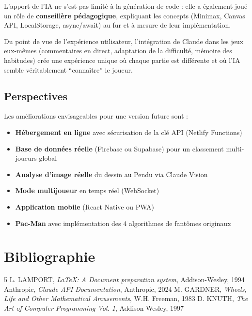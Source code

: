 \documentclass[a4paper, 12pt, twoside]{article}
\begin{document}
L'apport de l'IA ne s'est pas limité à la génération de code : elle a également joué un rôle de \textbf{conseillère pédagogique}, expliquant les concepts (Minimax, Canvas API, LocalStorage, async/await) au fur et à mesure de leur implémentation.

Du point de vue de l'expérience utilisateur, l'intégration de Claude dans les jeux eux-mêmes (commentaires en direct, adaptation de la difficulté, mémoire des habitudes) crée une expérience unique où chaque partie est différente et où l'IA semble véritablement ``connaître'' le joueur.

\subsection{Perspectives}

Les améliorations envisageables pour une version future sont :
\begin{itemize}
  \item \textbf{Hébergement en ligne} avec sécurisation de la clé API (Netlify Functions)
  \item \textbf{Base de données réelle} (Firebase ou Supabase) pour un classement multi-joueurs global
  \item \textbf{Analyse d'image réelle} du dessin au Pendu via Claude Vision
  \item \textbf{Mode multijoueur} en temps réel (WebSocket)
  \item \textbf{Application mobile} (React Native ou PWA)
  \item \textbf{Pac-Man} avec implémentation des 4 algorithmes de fantômes originaux
\end{itemize}

\newpage

\section{Bibliographie}

\renewcommand{\bibname}{}
\renewcommand{\refname}{}
\begin{thebibliography}{5}
   L. LAMPORT, {\it \LaTeX : A Document preparation system}, Addison-Wesley, 1994
   Anthropic, {\it Claude API Documentation}, Anthropic, 2024
   M. GARDNER, {\it Wheels, Life and Other Mathematical Amusements}, W.H. Freeman, 1983
   D. KNUTH, {\it The Art of Computer Programming Vol. 1}, Addison-Wesley, 1997
\end{thebibliography}
\end{document}
